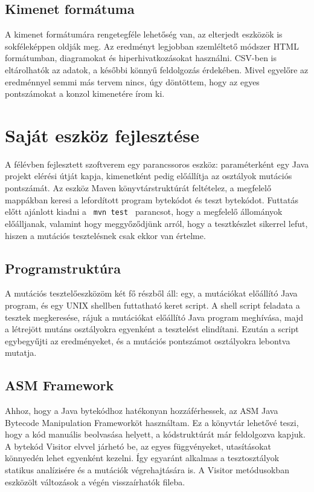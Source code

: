 \subsection{Kimenet formátuma}
A kimenet formátumára rengetegféle lehetőség van, az elterjedt eszközök is sokféleképpen oldják meg. Az eredményt legjobban szemléltető módszer HTML formátumban, diagramokat és hiperhivatkozásokat használni. CSV-ben is eltárolhatók az adatok, a későbbi könnyű feldolgozás érdekében. Mivel egyelőre az eredménnyel semmi más tervem nincs, úgy döntöttem, hogy az egyes pontszámokat a konzol kimenetére írom ki.
\section{Saját eszköz fejlesztése}
A félévben fejlesztett szoftverem egy parancssoros eszköz: paraméterként egy Java projekt elérési útját kapja, kimenetként pedig előállítja az osztályok mutációs pontszámát. Az eszköz Maven könyvtárstruktúrát feltételez, a megfelelő mappákban keresi a lefordított program bytekódot és teszt bytekódot. Futtatás előtt ajánlott kiadni a \lstinline{ mvn test } parancsot, hogy a megfelelő állományok előálljanak, valamint hogy meggyőződjünk arról, hogy a tesztkészlet sikerrel lefut, hiszen a mutációs tesztelésnek csak ekkor van értelme.
\subsection{Programstruktúra}
A mutációs tesztelőeszközöm két fő részből áll: egy, a mutációkat előállító Java program, és egy UNIX shellben futtatható keret script. A shell script feladata a tesztek megkeresése, rájuk a mutációkat előállító Java program meghívása, majd a létrejött mutáns osztályokra egyenként a tesztelést elindítani. Ezután a script egybegyűjti az eredményeket, és a mutációs pontszámot osztályokra lebontva mutatja.
\subsection{ASM Framework}
Ahhoz, hogy a Java bytekódhoz hatékonyan hozzáférhessek, az ASM Java Bytecode Manipulation Frameworköt használtam. Ez a könyvtár lehetővé teszi, hogy a kód manuális beolvasása helyett, a kódstruktúrát már feldolgozva kapjuk. A bytekód Visitor elvvel járhetó be, az egyes függvényeket, utasításokat könnyedén lehet egyenként kezelni. Így egyaránt alkalmas a tesztosztályok statikus analízisére és a mutációk végrehajtására is. A Visitor metódusokban eszközölt változások a végén visszaírhatók fileba.

